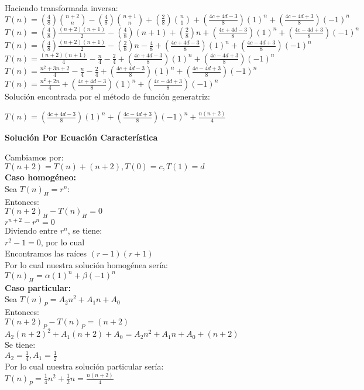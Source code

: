 \documentclass{article}
\begin{document}
\begin{enumerate}[label=\textbf{\alph*.}]
  Haciendo transformada inversa:\\
  $T(n) = (\frac{4}{8}){n+2 \choose n} - (\frac{4}{8}){n + 1 \choose n} + (\frac{2}{8}){n \choose 1} + (\frac{4c+4d-3}{8})(1)^n + (\frac{4c-4d+3}{8})(-1)^n$\\
  $T(n) = (\frac{4}{8}) \frac{(n+2)(n+1)}{2} - (\frac{4}{8})(n+1) + (\frac{2}{8})n + (\frac{4c+4d-3}{8})(1)^n + (\frac{4c-4d+3}{8})(-1)^n$\\
  $T(n) = (\frac{4}{8}) \frac{(n+2)(n+1)}{2}- (\frac{2}{8})n - \frac{4}{8}  + (\frac{4c+4d-3}{8})(1)^n + (\frac{4c-4d+3}{8})(-1)^n$\\
  $T(n) = \frac{(n+2)(n+1)}{4}- \frac{n}{4} - \frac{2}{4} + (\frac{4c+4d-3}{8})(1)^n + (\frac{4c-4d+3}{8})(-1)^n$\\
  $T(n) = \frac{n^2+3n+2}{4}- \frac{n}{4} - \frac{2}{4} + (\frac{4c+4d-3}{8})(1)^n + (\frac{4c-4d+3}{8})(-1)^n$\\
  $T(n) = \frac{n^2+2n}{4} + (\frac{4c+4d-3}{8})(1)^n + (\frac{4c-4d+3}{8})(-1)^n$\\
  
  Soluci\'on encontrada por el m\'etodo de función generatriz:
  \begin{center}
    $T(n) = (\frac{4c + 4d - 3}{8})(1)^n + (\frac{4c - 4d + 3}{8})(-1)^n + \frac{n(n+2)}{4}$
  \end{center}
  
  \textbf{Soluci\'on Por Ecuaci\'on Caracter\'istica}
  
  Cambiamos por:\\
  $T(n+2)=T(n)+(n+2), T(0)=c,T(1)=d$\\
  
  \textbf{Caso homogéneo:}\\
  Sea $T(n)_H = r^n$:\\
  Entonces:\\
  $T(n+2)_H-T(n)_H=0$\\
  $r^{n+2} - r^{n} = 0$\\
  Diviendo entre $r^{n}$, se tiene:\\
  $r^2 - 1 = 0$, por lo cual\\
  Encontramos las raíces $(r-1)(r+1)$\\
  Por lo cual nuestra solución homogénea sería:\\
  $T(n)_H = \alpha (1)^n + \beta (-1)^n$\\
  
  \textbf{Caso particular:}\\
  Sea $T(n)_P = A_2n^2+A_1n+A_0$\\
  Entonces:\\
  $T(n+2)_P - T(n)_P = (n+2)$\\
  $A_2(n+2)^2+A_1(n+2)+A_0 = A_2n^2+A_1n+A_0 + (n+2)$\\
  Se tiene:\\
  $A_2=\frac{1}{4}, A_1=\frac{1}{2}$\\
  Por lo cual nuestra solución particular sería:\\
  $T(n)_P = \frac{1}{4}n^2 +\frac{1}{2}n = \frac{n(n+2)}{4}$\\
  

\end{enumerate}
\end{document}
